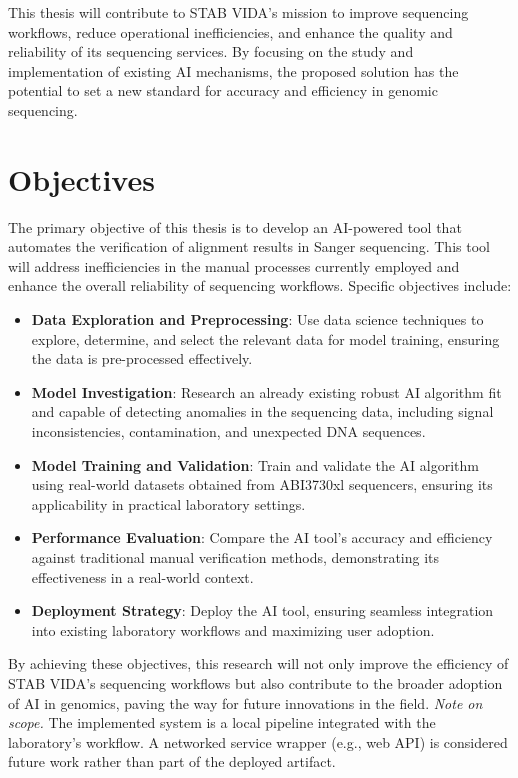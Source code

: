 This thesis will contribute to STAB VIDA’s mission to improve sequencing workflows, reduce operational inefficiencies, and enhance the quality and reliability of its sequencing services. By focusing on the study and implementation of existing AI mechanisms, the proposed solution has the potential to set a new standard for accuracy and efficiency in genomic sequencing.

\section{Objectives}
\label{sec:Objectives}

The primary objective of this thesis is to develop an AI-powered tool that automates the verification of alignment results in Sanger sequencing. This tool will address inefficiencies in the manual processes currently employed and enhance the overall reliability of sequencing workflows. Specific objectives include:

\begin{itemize}
  \item \textbf{Data Exploration and Preprocessing}: Use data science techniques to explore, determine, and select the relevant data for model training, ensuring the data is pre-processed effectively.
  \item \textbf{Model Investigation}: Research an already existing robust AI algorithm fit and capable of detecting anomalies in the sequencing data, including signal inconsistencies, contamination, and unexpected DNA sequences.
  \item \textbf{Model Training and Validation}: Train and validate the AI algorithm using real-world datasets obtained from ABI3730xl sequencers, ensuring its applicability in practical laboratory settings.
  \item \textbf{Performance Evaluation}: Compare the AI tool's accuracy and efficiency against traditional manual verification methods, demonstrating its effectiveness in a real-world context.
  \item \textbf{Deployment Strategy}: Deploy the AI tool, ensuring seamless integration into existing laboratory workflows and maximizing user adoption.
\end{itemize}

By achieving these objectives, this research will not only improve the efficiency of STAB VIDA’s sequencing workflows but also contribute to the broader adoption of AI in genomics, paving the way for future innovations in the field.
\noindent\emph{Note on scope.} The implemented system is a local pipeline integrated with the laboratory’s workflow. A networked service wrapper (e.g., web API) is considered future work rather than part of the deployed artifact.

